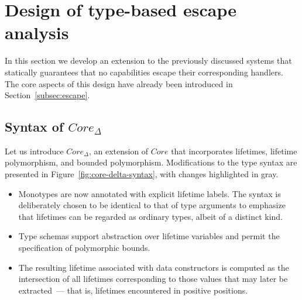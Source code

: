 \documentclass[acmsmall,review,screen]{acmart}
\begin{document}




\section{Design of type-based escape analysis} \label{sec:escape}

In this section we develop an extension to the previously discussed systems that statically guarantees that no capabilities escape their corresponding handlers.
The core aspects of this design have already been introduced in Section~\ref{subsec:escape}.

\subsection{Syntax of $Core_\Delta$}

Let us introduce $Core_\Delta$, an extension of $Core$ that incorporates lifetimes, lifetime polymorphism, and bounded polymorphism.
Modifications to the type syntax are presented in Figure~\ref{fig:core-delta-syntax}, with changes highlighted in gray.
\begin{itemize}
    \item Monotypes are now annotated with explicit lifetime labels.
    The syntax is deliberately chosen to be identical to that of type arguments to emphasize that lifetimes can be regarded as ordinary types, albeit of a distinct kind.
    \item Type schemas support abstraction over lifetime variables and permit the specification of polymorphic bounds.
    \item The resulting lifetime associated with data constructors is computed as the intersection of all lifetimes corresponding to those values that may later be extracted~--- that is, lifetimes encountered in positive positions.
\end{itemize}

\end{document}
